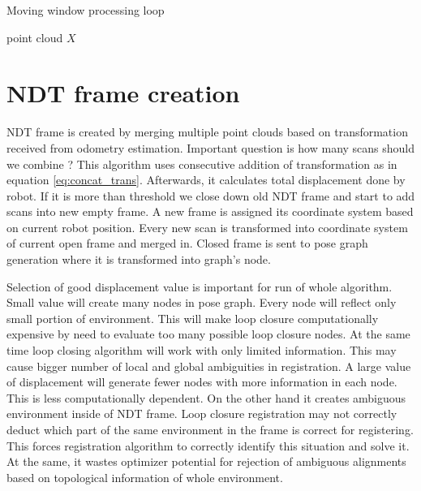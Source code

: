 \begin{algorithm}
\label{alg:move_window}
    \caption{Moving window processing loop}
\begin{algorithmic}[1]
\Require point cloud $X$
 
 \EndFunction
\end{algorithmic}
\end{algorithm}

\newpage

\section{NDT frame creation}
\label{sec:NDT_frame}
\gls{NDT} frame is created by merging multiple point clouds based on transformation received from odometry estimation. Important question is how many scans should we combine ? This algorithm uses consecutive addition of transformation as in equation \ref{eq:concat_trans}. Afterwards, it calculates total displacement done by robot. If it is more than threshold we close down old \gls{NDT} frame and start to add scans into new empty frame. A new frame is assigned its coordinate system based on current robot position. Every new scan is transformed into coordinate system of current open frame and merged in. Closed frame is sent to pose graph generation where it is transformed into graph's node.

Selection of good displacement value is important for run of whole algorithm. Small value will create many nodes in pose graph. Every node will reflect only small portion of environment. This will make loop closure computationally expensive by need to evaluate too many possible loop closure nodes. At the same time loop closing algorithm will work with only limited information. This may cause bigger number of local and global ambiguities in registration. A large value of displacement will generate fewer nodes with more information in each node. This is less computationally dependent. On the other hand it creates ambiguous environment inside of \gls{NDT} frame. Loop closure registration may not correctly deduct which part of the same environment in the frame is correct for registering. This forces registration algorithm to correctly identify this situation and solve it. At the same, it wastes optimizer potential for rejection of ambiguous alignments based on topological information of whole environment. 

